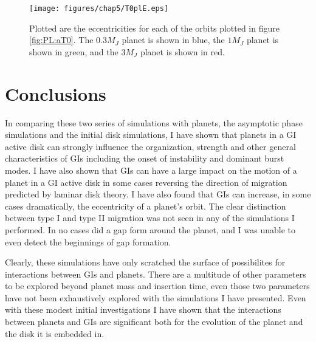 \begin{figure}[p]
\centering
\texttt{[image: figures/chap5/T0plE.eps]}
\caption[NEED TAGLINE]{Plotted are the eccentricities for each of the orbits plotted in figure \ref{fig:PL:aT0}. The $0.3 M_J$ planet is shown in blue, the $1 M_J$ planet is shown in green, and  the $3 M_J$ planet is shown in red.}
\label{fig:PL:eT0}
\end{figure}




\section{Conclusions} \label{sec:PL:conclusion}

In comparing these two series of simulations with planets, the asymptotic phase simulations and the initial disk simulations, I have shown that planets in a GI active disk can strongly influence the organization, strength and other general characteristics of GIs including the onset of instability and dominant burst modes. I have also shown that GIs can have a large impact on the motion of a planet in a GI active disk in some cases reversing the direction of migration predicted by laminar disk theory. I have also found that GIs can increase, in some cases dramatically, the eccentricity of a planet's orbit. The clear distinction between type I and type II migration was not seen in any of the simulations I performed. In no cases did a gap form around the planet, and I was unable to even detect the beginnings of gap formation. 

Clearly, these simulations have only scratched the surface of possibilites for interactions between GIs and planets. There are a multitude of other parameters to be explored beyond planet mass and insertion time, even those two parameters have not been exhaustively explored with the simulations I have presented. Even with these modest initial investigations I have shown that the interactions between planets and GIs are significant both for the evolution of the planet and the disk it is embedded in.
